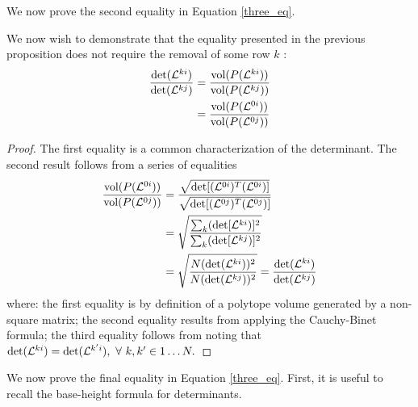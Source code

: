 We now prove the second equality in Equation \ref{three_eq}.

\begin{prop}{We now wish to demonstrate that the equality presented in the previous proposition does not require the removal of some row $k$ \cite{Drucker2015}:
\[
\begin{aligned}
\frac{\det(\mathcal{L}^{ki})}{\det(\mathcal{L}^{kj})} &= \frac{{{\rm vol}(P(\mathcal{L}^{ki}))}}{{{\rm vol}(P(\mathcal{L}^{kj}))}}\\
&= \frac{{{\rm vol}(P(\mathcal{L}^{0i}))}}{{{\rm vol}(P(\mathcal{L}^{0j}))}}\\
\end{aligned}
\]
}
\begin{proof}
The first equality is a common characterization of the determinant.  The second result follows from a series of equalities 
\[
\begin{aligned}
\frac{{\rm vol}(P(\mathcal{L}^{0i}))}{{\rm vol}(P(\mathcal{L}^{0j}))} &= \frac{\sqrt{\det[(\mathcal{L}^{0i})^T(\mathcal{L}^{0i})]}}{\sqrt{\det[(\mathcal{L}^{0j})^T(\mathcal{L}^{0j})]}}\\
& = \sqrt{\frac{\sum_k (\det[\mathcal{L}^{ki})]^2} {\sum_k (\det[\mathcal{L}^{kj})]^2} }\\
& = \sqrt{\frac{N(\det(\mathcal{L}^{ki}))^2} {N(\det(\mathcal{L}^{kj}))^2} } = \frac{\det(\mathcal{L}^{ki})}{\det(\mathcal{L}^{kj})}\\
\end{aligned}
\]
where: the first equality is by definition of a polytope volume generated by a non-square matrix; the second equality results from applying the Cauchy-Binet formula; the third equality follows from noting that $\det(\mathcal{L}^{ki}) = \det(\mathcal{L}^{k'i}), \ \forall \ k,k' \in 1\ldots N.$
\end{proof}
\end{prop}

We now prove the final equality in Equation \ref{three_eq}.  First, it is useful to recall the base-height formula for determinants.

